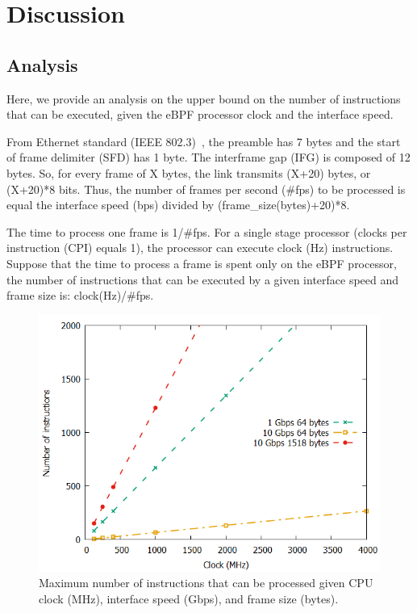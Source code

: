 \section{Discussion}
\label{sec:discussion}

\subsection{Analysis}

Here, we provide an analysis on the upper bound on the number of instructions that can be executed, given the eBPF processor clock and the interface speed.

From Ethernet standard (IEEE 802.3)~\cite{EthernetStandard}, the preamble has 7 bytes and the start of frame delimiter (SFD) has 1 byte. The interframe gap (IFG) is composed of 12 bytes.
So, for every frame of X bytes, the link transmits (X+20) bytes, or (X+20)*8 bits. Thus, the number of frames per second (\#fps) to be processed is equal the interface speed (bps) divided by (frame\_size(bytes)+20)*8.

The time to process one frame is 1/\#fps.
For a single stage processor (clocks per instruction (CPI) equals 1), the processor can execute clock (Hz) instructions.
Suppose that the time to process a frame is spent only on the eBPF processor, the number of instructions that can be executed by a given interface speed and frame size is: clock(Hz)/\#fps.

\begin{figure}[htb]
\centering
\includegraphics[width=1.\linewidth]{figures/numberInstructionsPerClock.png}
\caption{Maximum number of instructions that can be processed given CPU clock (MHz),  interface speed (Gbps), and frame size (bytes).}
\label{fig:instructionsPerClock}
\end{figure}

